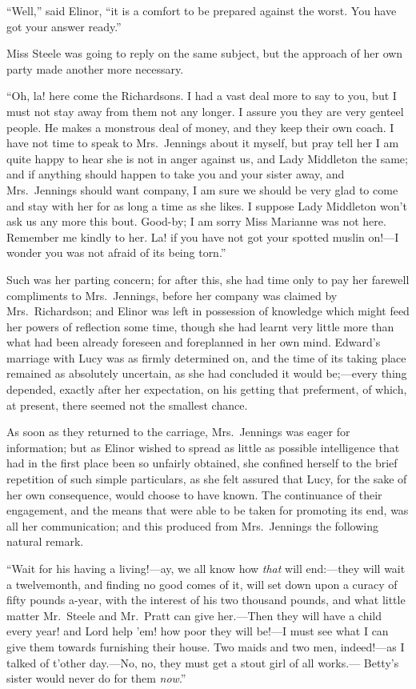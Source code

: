 \documentclass{article}
\begin{document}
``Well,'' said Elinor, ``it is a comfort to be prepared
against the worst.  You have got your answer ready.''

Miss Steele was going to reply on the same subject,
but the approach of her own party made another more necessary.

``Oh, la! here come the Richardsons.  I had a vast deal
more to say to you, but I must not stay away from them not
any longer.  I assure you they are very genteel people.
He makes a monstrous deal of money, and they keep their
own coach.  I have not time to speak to Mrs.\ Jennings about
it myself, but pray tell her I am quite happy to hear she
is not in anger against us, and Lady Middleton the same;
and if anything should happen to take you and your
sister away, and Mrs.\ Jennings should want company,
I am sure we should be very glad to come and stay with her
for as long a time as she likes.  I suppose Lady Middleton
won't ask us any more this bout.  Good-by; I am sorry
Miss Marianne was not here.  Remember me kindly to her.
La! if you have not got your spotted muslin on!---I wonder
you was not afraid of its being torn.''

Such was her parting concern; for after this, she had
time only to pay her farewell compliments to Mrs.\ Jennings,
before her company was claimed by Mrs.\ Richardson;
and Elinor was left in possession of knowledge which
might feed her powers of reflection some time, though she
had learnt very little more than what had been already
foreseen and foreplanned in her own mind.  Edward's marriage
with Lucy was as firmly determined on, and the time
of its taking place remained as absolutely uncertain,
as she had concluded it would be;---every thing depended,
exactly after her expectation, on his getting that preferment,
of which, at present, there seemed not the smallest chance.

As soon as they returned to the carriage,
Mrs.\ Jennings was eager for information; but as Elinor
wished to spread as little as possible intelligence
that had in the first place been so unfairly obtained,
she confined herself to the brief repetition of such
simple particulars, as she felt assured that Lucy,
for the sake of her own consequence, would choose
to have known.  The continuance of their engagement,
and the means that were able to be taken for promoting
its end, was all her communication; and this produced
from Mrs.\ Jennings the following natural remark.

``Wait for his having a living!---ay, we all know how
\emph{that} will end:---they will wait a twelvemonth, and finding
no good comes of it, will set down upon a curacy of fifty
pounds a-year, with the interest of his two thousand pounds,
and what little matter Mr.\ Steele and Mr.\ Pratt can
give her.---Then they will have a child every year! and
Lord help 'em! how poor they will be!---I must see
what I can give them towards furnishing their house.
Two maids and two men, indeed!---as I talked of t'other
day.---No, no, they must get a stout girl of all works.---%
Betty's sister would never do for them \emph{now}.''
\end{document}
